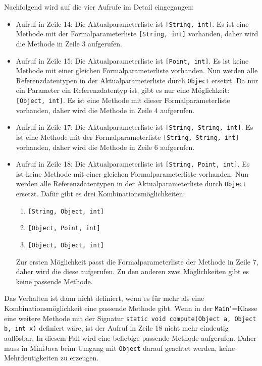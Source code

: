 

Nachfolgend wird auf die vier Aufrufe im Detail eingegangen:
\begin{itemize}
    \item Aufruf in Zeile 14: Die Aktualparameterliste ist \lstinline{[String, int]}. Es ist eine Methode mit der Formalparameterliste \lstinline{[String, int]} vorhanden, daher wird die Methode in Zeile 3 aufgerufen.
    \item Aufruf in Zeile 15: Die Aktualparameterliste ist \lstinline{[Point, int]}. Es ist keine Methode mit einer gleichen Formalparameterliste vorhanden. Nun werden alle Referenzdatentypen in der Aktualparameterliste durch \lstinline{Object} ersetzt. Da nur ein Parameter ein Referenzdatentyp ist, gibt es nur eine Möglichkeit: \lstinline{[Object, int]}. Es ist eine Methode mit dieser Formalparameterliste vorhanden, daher wird die Methode in Zeile 4 aufgerufen.
    \item Aufruf in Zeile 17: Die Aktualparameterliste ist \lstinline{[String, String, int]}. Es ist eine Methode mit der Formalparameterliste \lstinline{[String, String, int]} vorhanden, daher wird die Methode in Zeile 6 aufgerufen.
    \item Aufruf in Zeile 18: Die Aktualparameterliste ist \lstinline{[String, Point, int]}. Es ist keine Methode mit einer gleichen Formalparameterliste vorhanden. Nun werden alle Referenzdatentypen in der Aktualparameterliste durch \lstinline{Object} ersetzt. Dafür gibt es drei Kombinationsmöglichkeiten:
    \begin{enumerate}
        \item \lstinline{[String, Object, int]}
        \item \lstinline{[Object, Point, int]}
        \item \lstinline{[Object, Object, int]}
    \end{enumerate}
    Zur ersten Möglichkeit passt die Formalparameterliste der Methode in Zeile 7, daher wird die diese aufgerufen. Zu den anderen zwei Möglichkeiten gibt es keine passende Methode.
\end{itemize}

Das Verhalten ist dann nicht definiert, wenn es für mehr als eine Kombinationsmöglichkeit eine passende Methode gibt. Wenn in der \lstinline{Main}"=Klasse eine weitere Methode mit der Signatur \lstinline{static void compute(Object a, Object b, int x)} definiert wäre, ist der Aufruf in Zeile 18 nicht mehr eindeutig auflösbar. In diesem Fall wird eine beliebige passende Methode aufgerufen. Daher muss in MiniJava beim Umgang mit \lstinline{Object} darauf geachtet werden, keine Mehrdeutigkeiten zu erzeugen.


